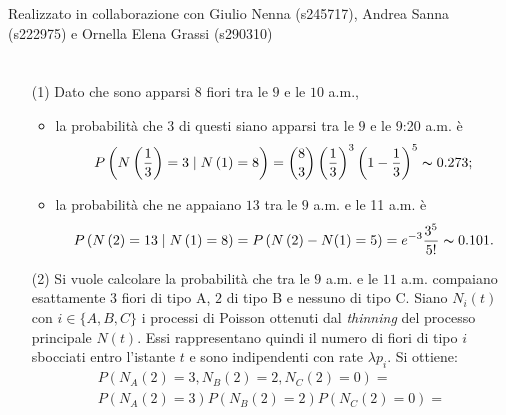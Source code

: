 \documentclass[11pt,largemargins]{homework}
\begin{document}
\maketitle
\begin{center}
Realizzato in collaborazione con Giulio Nenna (s245717), Andrea Sanna (s222975) e Ornella Elena Grassi (s290310)
\end{center}
\section{}%
  
    
    
  \begin{enumerate}
 
  
    \item[(1)]
    Dato che sono apparsi $8$ fiori tra le $9$ e le $10$ a.m.,
    \begin{itemize}
    \item
    la probabilità che $3$ di questi siano apparsi tra le $9$ e le 9:20 a.m. è
    \begin{equation*}
    P\left(N\left(\frac{1}{3}\right)=3\mid N\left(1\right)=8\right)=\binom{8}{3}\left(\frac{1}{3}\right)^{3}\left(1-\frac{1}{3}\right)^{5}\thicksim 0.273;
    \end{equation*}
    \item
    la probabilità che ne appaiano $13$ tra le $9$ a.m. e le 11 a.m. è
     \begin{gather*}
     P\left(N\left(2\right)=13\mid N\left(1\right)=8\right)=P\left(N\left(2\right) - N(1)=5\right)=e^{-3}\frac{3^{5}}{5!}\thicksim 0.101.
     \end{gather*}
    \end{itemize} 
    \item[(2)]
    Si vuole calcolare la probabilità che tra le $9$ a.m. e le $11$ a.m. compaiano esattamente $3$ fiori di tipo A, $2$ di tipo B e nessuno di tipo C. Siano $N_{i}\left(t\right)$ con $i \in \{A, B, C\}$ i processi di Poisson ottenuti dal \textit{thinning} del processo principale \(N(t)\). Essi rappresentano quindi il numero di fiori di tipo \(i\) sbocciati entro l'istante \(t\) e sono indipendenti con rate \(\lambda p_i\). Si ottiene:
    \begin{gather*}
    P\left(N_{A}\left(2\right)=3, N_{B}\left(2\right)=2,N_{C}\left(2\right)=0\right)=\\
    P(N_A(2)=3)P(N_B(2)=2)P(N_C(2)=0)=\\

\end{gather*}
\end{enumerate}
\end{document}
